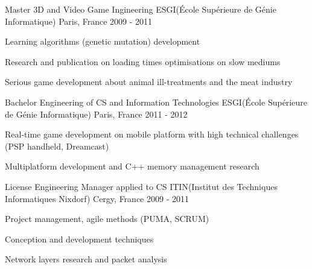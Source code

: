 

\begin{cventries}
  \cventry
    {Master 3D and Video Game Ingineering} %
    {ESGI(École Supérieure de Génie Informatique)} %
    {Paris, France} %
    {2009 - 2011} %
    {
      \begin{cvitems} %
        \item {Learning algorithms (genetic mutation) development}
        \item {Research and publication on loading times optimisations on slow mediums}
        \item {Serious game development about animal ill-treatments and the meat industry}
      \end{cvitems}
    }

  \cventry
    {Bachelor Engineering of CS and Information Technologies} %
    {ESGI(École Supérieure de Génie Informatique)} %
    {Paris, France} %
    {2011 - 2012} %
    {
      \begin{cvitems} %
        \item {Real-time game development on mobile platform with high technical challenges (PSP handheld, Dreamcast)}
        \item {Multiplatform development and C++ memory management research}
      \end{cvitems}
    }

  \cventry
    {License Engineering Manager applied to CS} %
    {ITIN(Institut des Techniques Informatiques Nixdorf)} %
    {Cergy, France} %
    {2009 - 2011} %
    {
      \begin{cvitems} %
        \item {Project management, agile methods (PUMA, SCRUM)}
        \item {Conception and development techniques}
        \item {Network layers research and packet analysis}
      \end{cvitems}
    }

\end{cventries}
